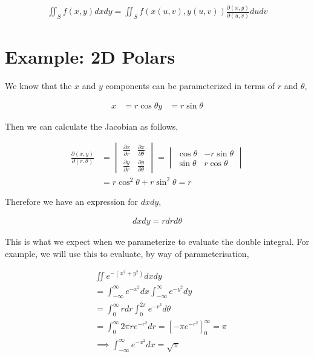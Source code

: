 \documentclass[11pt]{amsart}
\begin{document}
\begin{align*}
  \iint_S f(x, y) dx dy = \iint_S f\left(x(u, v), y(u, v)\right) \frac{\partial (x, y)}{\partial (u, v)} du dv
\end{align*}

\section{Example: 2D Polars}

We know that the $x$ and $y$ components can be parameterized in terms of $r$ and $\theta$,

\begin{align*}
  x &= r\cos\theta
  y &= r\sin\theta
\end{align*}

Then we can calculate the Jacobian as follows,

\begin{align*}
  \frac{\partial(x, y)}{\partial(r, \theta)} &=
  \begin{vmatrix}
    \frac{\partial x}{\partial r} & \frac{\partial x}{\partial \theta} \\[4pt]
    \frac{\partial y}{\partial r} & \frac{\partial y}{\partial \theta}
  \end{vmatrix} =
  \begin{vmatrix}
    \cos\theta & -r\sin\theta \\
    \sin\theta & r\cos\theta
  \end{vmatrix} \\
  &= r\cos^2\theta + r\sin^2\theta = r
\end{align*}

Therefore we have an expression for $dx dy$,

\begin{align*}
  dx dy = r dr d\theta
\end{align*}

This is what we expect when we parameterize to evaluate the double integral. For example, we will use this to evaluate, by way of parameterisation,

\begin{align*}
  & \iint e^{-(x^2 + y^2)} dx dy \\
  &= \int_{-\infty}^\infty e^{-x^2} dx \int_{-\infty}^{\infty} e^{-y^2} dy \\
  &= \int_0^\infty r dr \int_0^{2\pi} e^{-r^2} d\theta \\
  &= \int_0^\infty 2\pi re^{-r^2} dr = {\left[-\pi e^{-r^2}\right]}_0^\infty = \pi \\
  &\implies \int_{-\infty}^\infty e^{-x^2} dx = \sqrt{\pi}
\end{align*}
\end{document}
